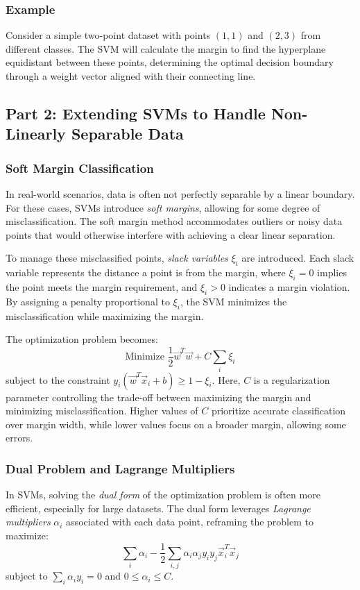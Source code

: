 \documentclass{article}
\begin{document}
\subsubsection*{Example}
Consider a simple two-point dataset with points \( (1,1) \) and \( (2,3) \) from different classes. The SVM will calculate the margin to find the hyperplane equidistant between these points, determining the optimal decision boundary through a weight vector aligned with their connecting line.

\subsection*{Part 2: Extending SVMs to Handle Non-Linearly Separable Data}

\subsubsection*{Soft Margin Classification}
In real-world scenarios, data is often not perfectly separable by a linear boundary. For these cases, SVMs introduce \emph{soft margins}, allowing for some degree of misclassification. The soft margin method accommodates outliers or noisy data points that would otherwise interfere with achieving a clear linear separation.

To manage these misclassified points, \emph{slack variables} \( \xi_i \) are introduced. Each slack variable represents the distance a point is from the margin, where \( \xi_i = 0 \) implies the point meets the margin requirement, and \( \xi_i > 0 \) indicates a margin violation. By assigning a penalty proportional to \( \xi_i \), the SVM minimizes the misclassification while maximizing the margin.

The optimization problem becomes:
\[
\text{Minimize } \frac{1}{2} \vec{w}^T \vec{w} + C \sum_{i} \xi_i
\]
subject to the constraint \( y_i (\vec{w}^T \vec{x}_i + b) \geq 1 - \xi_i \). Here, \( C \) is a regularization parameter controlling the trade-off between maximizing the margin and minimizing misclassification. Higher values of \( C \) prioritize accurate classification over margin width, while lower values focus on a broader margin, allowing some errors.

\subsubsection*{Dual Problem and Lagrange Multipliers}
In SVMs, solving the \emph{dual form} of the optimization problem is often more efficient, especially for large datasets. The dual form leverages \emph{Lagrange multipliers} \( \alpha_i \) associated with each data point, reframing the problem to maximize:
\[
\sum_{i} \alpha_i - \frac{1}{2} \sum_{i,j} \alpha_i \alpha_j y_i y_j \vec{x}_i^T \vec{x}_j
\]
subject to \( \sum_{i} \alpha_i y_i = 0 \) and \( 0 \leq \alpha_i \leq C \).
\end{document}
